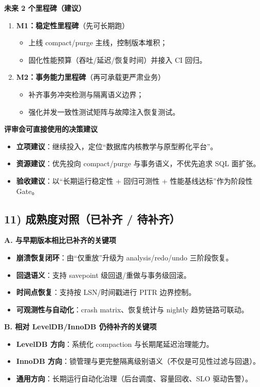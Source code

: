 \textbf{未来 2 个里程碑（建议）}
\begin{enumerate}
  \item \textbf{M1：稳定性里程碑}（先可长期跑）
  \begin{itemize}
    \item 上线 compact/purge 主线，控制版本堆积；
    \item 固化性能预算（吞吐/延迟/恢复时间）并接入 CI 回归。
  \end{itemize}
  \item \textbf{M2：事务能力里程碑}（再可承载更严肃业务）
  \begin{itemize}
    \item 补齐事务冲突检测与隔离语义边界；
    \item 强化并发一致性测试矩阵与故障注入恢复测试。
  \end{itemize}
\end{enumerate}

\textbf{评审会可直接使用的决策建议}
\begin{itemize}
  \item \textbf{立项建议}：继续投入，定位“数据库内核教学与原型孵化平台”。
  \item \textbf{资源建议}：优先投向 compact/purge 与事务语义，不优先追求 SQL 面扩张。
  \item \textbf{验收建议}：以“长期运行稳定性 + 回归可测性 + 性能基线达标”作为阶段性 Gate。
\end{itemize}

\subsection{11) 成熟度对照（已补齐 / 待补齐）}

\textbf{A. 与早期版本相比已补齐的关键项}
\begin{itemize}
  \item \textbf{崩溃恢复闭环}：由“仅重放”升级为 analysis/redo/undo 三阶段恢复。
  \item \textbf{回退语义}：支持 savepoint 级回退/重做与事务级回滚。
  \item \textbf{时间点恢复}：支持按 LSN/时间戳进行 PITR 边界控制。
  \item \textbf{可观测性与自动化}：crash matrix、恢复统计与 nightly 趋势链路可联动。
\end{itemize}

\textbf{B. 相对 LevelDB/InnoDB 仍待补齐的关键项}
\begin{itemize}
  \item \textbf{LevelDB 方向}：系统化 compaction 与长期尾延迟治理能力。
  \item \textbf{InnoDB 方向}：锁管理与更完整隔离级别语义（不仅是可见性过滤与回退）。
  \item \textbf{通用方向}：长期运行自动化治理（后台调度、容量回收、SLO 驱动告警）。
\end{itemize}

